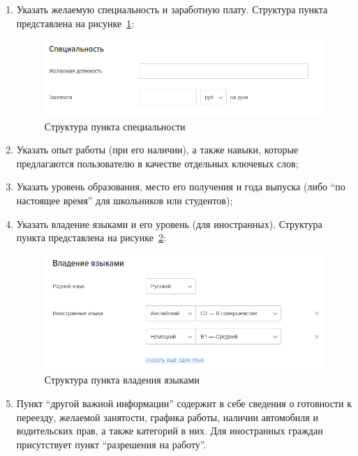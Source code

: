 \documentclass[master, och, pract]{SCWorks}
\begin{document}
\begin{enumerate}
    \item Указать желаемую специальность и заработную плату. Структура пункта 
    представлена на рисунке~\ref{fig:3}:
        \begin{figure}[!ht]
            \centering
            \includegraphics[width=12cm]{images/image3.png}
            \caption{\label{fig:3}%
                Структура пункта специальности}
        \end{figure}

    \item Указать опыт работы (при его наличии), а также навыки, которые 
    предлагаются пользователю в качестве отдельных ключевых слов;
    \item Указать уровень образования, место его получения и года выпуска 
    (либо “по настоящее время” для школьников или студентов);
    \item Указать владение языками и его уровень (для иностранных). Структура пункта 
    представлена на рисунке~\ref{fig:4}:
        \begin{figure}[!ht]
            \centering
            \includegraphics[width=12cm]{images/image1.png}
            \caption{\label{fig:4}%
                Структура пункта владения языками}
        \end{figure}

    \item Пункт “другой важной информации” содержит в себе сведения о готовности к переезду, 
    желаемой занятости, графика работы, наличии автомобиля и водительских прав, а также 
    категорий в них. Для иностранных граждан присутствует пункт “разрешения на работу”.
\end{enumerate}
\end{document}
